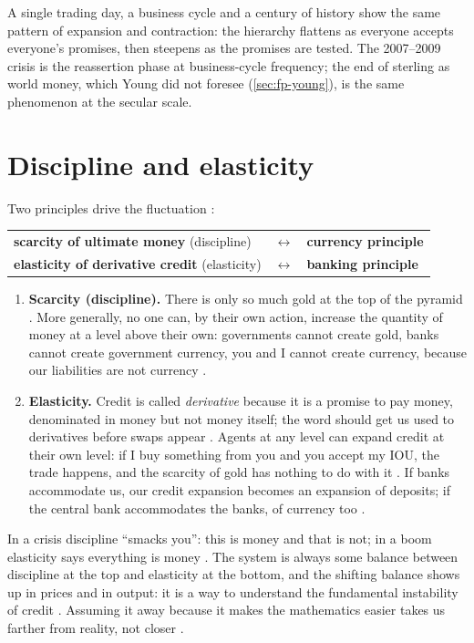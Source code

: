 \begin{paracol}{2}
\begin{finance}
A single trading day, a business cycle and a century of history show the same pattern of expansion and contraction:
the hierarchy flattens as everyone accepts everyone's promises, then steepens as the promises are tested. The
2007--2009 crisis is the reassertion phase at business-cycle frequency; the end of sterling as world money, which
Young did not foresee (\cref{sec:fp-young}), is the same phenomenon at the secular scale.
\end{finance}

\section{Discipline and elasticity}\label{sec:nh-discipline}

Two principles drive the fluctuation :

\begin{keyformulas}
\begin{tabularx}{\linewidth}{@{}L c L@{}}
\textbf{scarcity of ultimate money} (discipline) & $\leftrightarrow$ & \textbf{currency principle}\\
\textbf{elasticity of derivative credit} (elasticity) & $\leftrightarrow$ & \textbf{banking principle}\\
\end{tabularx}
\end{keyformulas}

\begin{enumerate}
  \item \textbf{Scarcity (discipline).} There is only so much gold at the top of the pyramid . More
        generally, no one can, by their own action, increase the quantity of money at a level above their own:
        governments cannot create gold, banks cannot create government currency, you and I cannot create
        currency, because our liabilities are not currency .
  \item \textbf{Elasticity.} Credit is called \emph{derivative} because it is a promise to pay money, denominated in
        money but not money itself; the word should get us used to derivatives before swaps appear
        . Agents at any level can expand credit at their own level: if I buy something
        from you and you accept my IOU, the trade happens, and the scarcity of gold has nothing to do with it
        . If banks accommodate us, our credit expansion becomes an expansion of
        deposits; if the central bank accommodates the banks, of currency too .
\end{enumerate}
In a crisis discipline ``smacks you'': this is money and that is not; in a boom elasticity says everything is money
. The system is always some balance between discipline at the top and elasticity at the bottom, and the
shifting balance shows up in prices and in output: it is a way to understand the fundamental instability of credit
. Assuming it away because it makes the mathematics easier takes us farther from reality,
not closer .


\end{paracol}
